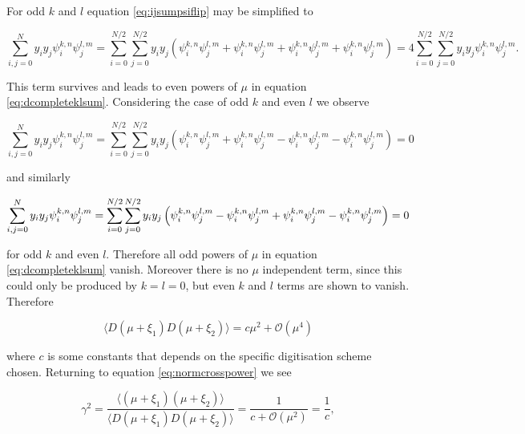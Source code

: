 \documentclass[apj]{emulateapj}
\begin{document}
For odd $k$ and $l$ equation \ref{eq:ijsumpsiflip} may be simplified to

\begin{equation}
\sum_{i,j = 0}^N y_i y_j \psi_i^{k, n} \psi_j^{l, m} = \sum_{i = 0}^{N/2}\sum_{j = 0}^{N/2} y_i y_j \left( \psi_i^{k, n} \psi_j^{l, m} + \psi_{i}^{k, n} \psi_j^{l, m} + \psi_i^{k, n} \psi_{j}^{l, m} + \psi_{i}^{k, n} \psi_{j}^{l, m} \right) = 4 \sum_{i = 0}^{N/2}\sum_{j = 0}^{N/2} y_i y_j \psi_i^{k, n} \psi_j^{l, m}.
\end{equation}

This term survives and leads to even powers of $\mu$ in equation \ref{eq:dcompleteklsum}. Considering the case of odd $k$ and even $l$ we observe

\begin{equation}
\sum_{i,j = 0}^N y_i y_j \psi_i^{k, n} \psi_j^{l, m} = \sum_{i = 0}^{N/2}\sum_{j = 0}^{N/2} y_i y_j \left( \psi_i^{k, n} \psi_j^{l, m} + \psi_{i}^{k, n} \psi_j^{l, m} - \psi_i^{k, n} \psi_{j}^{l, m} - \psi_{i}^{k, n} \psi_{j}^{l, m} \right) = 0
\end{equation}

and similarly

\begin{equation}
\sum_{i,j = 0}^N y_i y_j \psi_i^{k, n} \psi_j^{l, m} = \sum_{i = 0}^{N/2}\sum_{j = 0}^{N/2} y_i y_j \left( \psi_i^{k, n} \psi_j^{l, m} - \psi_{i}^{k, n} \psi_j^{l, m} + \psi_i^{k, n} \psi_{j}^{l, m} - \psi_{i}^{k, n} \psi_{j}^{l, m} \right) = 0\\
\end{equation}

for odd $k$ and even $l$. Therefore all odd powers of $\mu$ in equation \ref{eq:dcompleteklsum} vanish. Moreover there is no $\mu$ independent term, since this could only be produced by $k=l=0$, but even $k$ and $l$ terms are shown to vanish. Therefore

\begin{equation}
\langle D(\mu + \xi_1) D(\mu + \xi_2) \rangle = c \mu^2 + \mathcal{O}(\mu^4)
\end{equation}

where $c$ is some constants that depends on the specific digitisation scheme chosen. Returning to equation \ref{eq:normcrosspower} we see

\begin{equation}
\gamma^2  = \frac{\langle (\mu + \xi_1) (\mu + \xi_2) \rangle}{\langle D(\mu + \xi_1) D(\mu + \xi_2) \rangle} = \frac{1}{c + \mathcal{O}(\mu^2)} = \frac{1}{c},
\end{equation}
\end{document}
